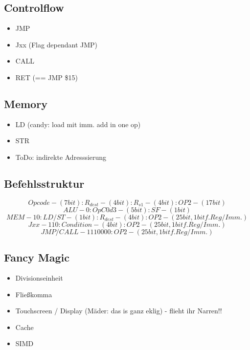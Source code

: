\documentclass[a4paper]{article}
\begin{document}
\begin{multicols}{2}
\subsection{Controlflow}

\begin{itemize}
\item JMP
\item Jxx (Flag dependant JMP)
\item CALL
\item RET (== JMP \$15)
\end{itemize}

\subsection{Memory}

\begin{itemize}
\item LD (candy: load mit imm. add in one op)
\item STR
\item ToDo: indirekte Adresssierung
\end{itemize}
\end{multicols}


\subsection{Befehlsstruktur}
\[Opcode - (7bit) : R_{dest} - (4bit) : R_{s1} - (4bit) : OP2 - (17bit)\]
\[ALU - 0 : OpC0d3 - (5bit) : SF - (1bit)\]
\[MEM - 10 : LD/ST - (1bit) : R_{dest} - (4bit) : OP2 - (25bit, 1bit f. Reg / Imm.)\]
\[Jxx - 110 : Condition - (4bit) : OP2 - (25bit, 1bit f. Reg / Imm.)\]
\[JMP/CALL - 1110000 : OP2 - (25bit, 1bit f. Reg / Imm.)\]

\subsection{Fancy Magic}

\begin{itemize}
\item Divisionseinheit
\item Fließkomma
\item Touchscreen / Display (Mäder: das is ganz eklig) - flieht ihr Narren!!
\item Cache
\item SIMD
\end{itemize}
\end{document}
